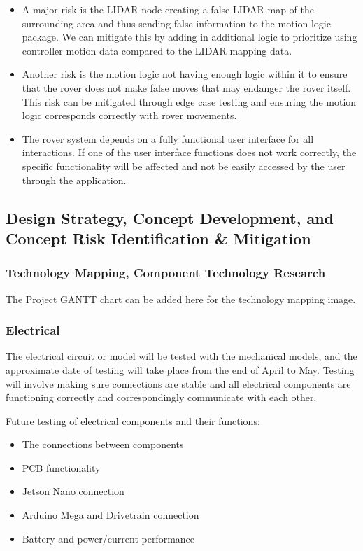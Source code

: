 \documentclass[a4paper, 10pt]{article}
\begin{document}
\begin{itemize}
\item
	A major risk is the LIDAR node creating a false LIDAR map of the surrounding area and thus sending false information to the motion logic package. We can mitigate this by adding in additional logic to prioritize using controller motion data compared to the LIDAR mapping data. 

\item
	Another risk is the motion logic not having enough logic within it to ensure that the rover does not make false moves that may endanger the rover itself. This risk can be mitigated through edge case testing and ensuring the motion logic corresponds correctly with rover movements. 

\item
	The rover system depends on a fully functional user interface for all interactions. If one of the user interface functions does not work correctly, the specific functionality will be affected and not be easily accessed by the user through the application. 
\end{itemize}
	\subsection{Design Strategy, Concept Development, and Concept Risk Identification \& Mitigation}


		\subsubsection{Technology Mapping, Component Technology Research}
		
		The Project GANTT chart can be added here for the technology mapping image.

		\subsubsection{Electrical}
		The electrical circuit or model will be tested with the mechanical models, and the approximate date of testing will take place from the end of April to May. Testing will involve making sure connections are stable and all electrical components are functioning correctly and correspondingly communicate with each other. 
		
Future testing of electrical components and their functions:
\begin{itemize}
\item
The connections between components

\item
PCB functionality

\item
Jetson Nano connection

\item
Arduino Mega and Drivetrain connection

\item
Battery and power/current performance
\end{itemize}
\end{document}
